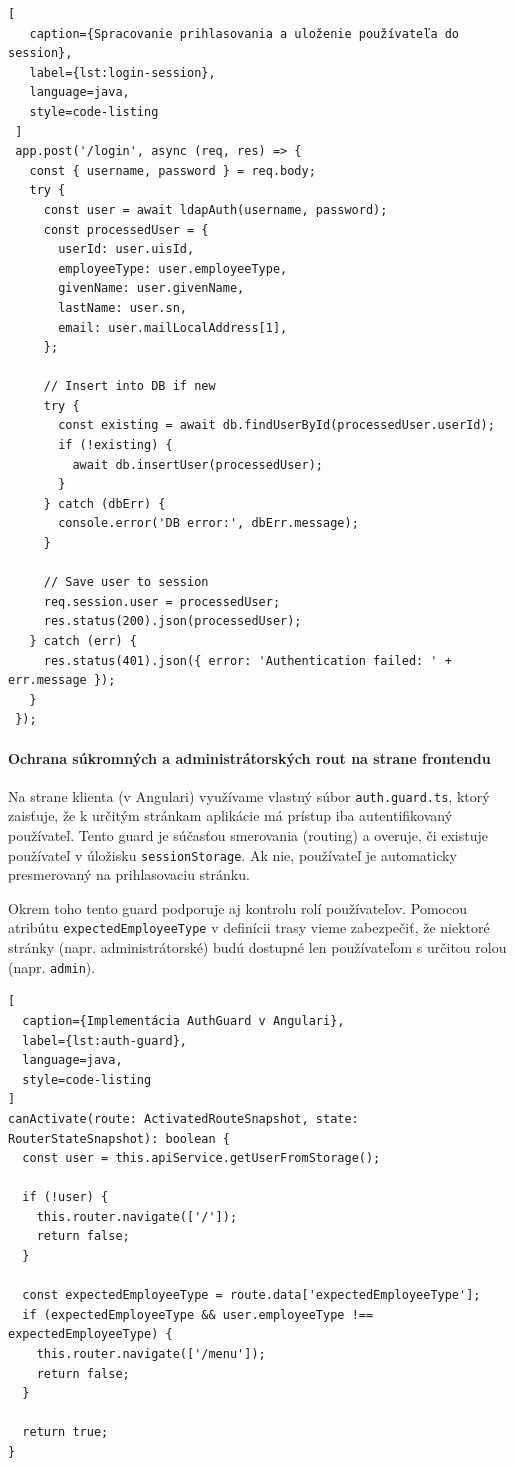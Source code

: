 \begin{lstlisting}[
   caption={Spracovanie prihlasovania a uloženie používateľa do session},
   label={lst:login-session},
   language=java,
   style=code-listing
 ]
 app.post('/login', async (req, res) => {
   const { username, password } = req.body;
   try {
     const user = await ldapAuth(username, password);
     const processedUser = {
       userId: user.uisId,
       employeeType: user.employeeType,
       givenName: user.givenName,
       lastName: user.sn,
       email: user.mailLocalAddress[1],
     };
 
     // Insert into DB if new
     try {
       const existing = await db.findUserById(processedUser.userId);
       if (!existing) {
         await db.insertUser(processedUser);
       }
     } catch (dbErr) {
       console.error('DB error:', dbErr.message);
     }
 
     // Save user to session
     req.session.user = processedUser;
     res.status(200).json(processedUser);
   } catch (err) {
     res.status(401).json({ error: 'Authentication failed: ' + err.message });
   }
 });
 \end{lstlisting}
 
 \paragraph{Ochrana súkromných a administrátorských rout na strane frontendu}

Na strane klienta (v Angulari) využívame vlastný súbor \texttt{auth.guard.ts}, ktorý zaisťuje, že k určitým stránkam aplikácie má prístup iba autentifikovaný používateľ. Tento guard je súčasťou smerovania (routing) a overuje, či existuje používateľ v úložisku \texttt{sessionStorage}. Ak nie, používateľ je automaticky presmerovaný na prihlasovaciu stránku.

Okrem toho tento guard podporuje aj kontrolu rolí používateľov. Pomocou atribútu \texttt{expectedEmployeeType} v definícii trasy vieme zabezpečiť, že niektoré stránky (napr. administrátorské) budú dostupné len používateľom s určitou rolou (napr. \texttt{admin}).

\begin{lstlisting}[
  caption={Implementácia AuthGuard v Angulari},
  label={lst:auth-guard},
  language=java,
  style=code-listing
]
canActivate(route: ActivatedRouteSnapshot, state: RouterStateSnapshot): boolean {
  const user = this.apiService.getUserFromStorage();

  if (!user) {
    this.router.navigate(['/']);
    return false;
  }

  const expectedEmployeeType = route.data['expectedEmployeeType'];
  if (expectedEmployeeType && user.employeeType !== expectedEmployeeType) {
    this.router.navigate(['/menu']);
    return false;
  }

  return true;
}
\end{lstlisting}

